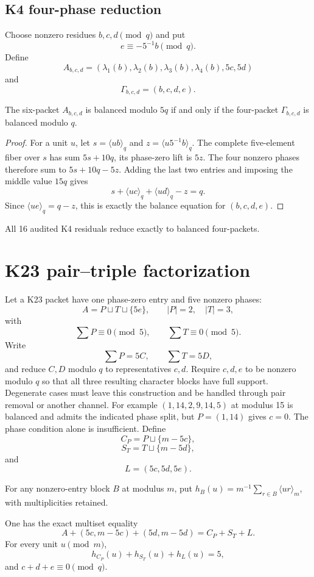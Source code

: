 \section{K4 four-phase reduction}
Choose nonzero residues \(b,c,d\pmod q\) and put
\[
e\equiv-5^{-1}b\pmod q.
\]
Define
\[
A_{b,c,d}=
(\lambda_1(b),\lambda_2(b),\lambda_3(b),\lambda_4(b),5c,5d)
\]
and
\[
\Gamma_{b,c,d}=(b,c,d,e).
\]

\begin{theorem}
The six-packet \(A_{b,c,d}\) is balanced modulo \(5q\) if and only if the four-packet \(\Gamma_{b,c,d}\) is balanced modulo \(q\).
\end{theorem}
\begin{proof}
For a unit \(u\), let \(s=\langle ub\rangle_q\) and \(z=\langle u5^{-1}b\rangle_q\). The complete five-element fiber over \(s\) has sum \(5s+10q\), its phase-zero lift is \(5z\). The four nonzero phases therefore sum to \(5s+10q-5z\). Adding the last two entries and imposing the middle value \(15q\) gives
\[
s+\langle uc\rangle_q+\langle ud\rangle_q-z=q.
\]
Since \(\langle ue\rangle_q=q-z\), this is exactly the balance equation for \((b,c,d,e)\).
\end{proof}

All 16 audited K4 residuals reduce exactly to balanced four-packets.

\chapter{K23 pair--triple factorization}
Let a K23 packet have one phase-zero entry and five nonzero phases:
\[
A=P\sqcup T\sqcup\{5e\},
\qquad |P|=2,
\quad |T|=3,
\]
with
\[
\sum P\equiv0\pmod5,
\qquad
\sum T\equiv0\pmod5.
\]
Write
\[
\sum P=5C,
\qquad
\sum T=5D,
\]
and reduce \(C,D\) modulo \(q\) to representatives \(c,d\). Require $c,d,e$ to be nonzero modulo $q$ so that all three resulting character blocks have full support. Degenerate cases must leave this construction and be handled through pair removal or another channel. For example $(1,14,2,9,14,5)$ at modulus 15 is balanced and admits the indicated phase split, but $P=(1,14)$ gives $c=0$. The phase condition alone is insufficient. Define
\[
C_P=P\sqcup\{m-5c\},
\]
\[
S_T=T\sqcup\{m-5d\},
\]
and
\[
L=(5c,5d,5e).
\]

For any nonzero-entry block $B$ at modulus $m$, put $h_B(u)=m^{-1}\sum_{r\in B}\langle ur\rangle_m$, with multiplicities retained.

\begin{theorem}
One has the exact multiset equality
\begin{equation}\label{eq:legacy-15.1}
\boxed{
A+(5c,m-5c)+(5d,m-5d)=C_P+S_T+L.
}\end{equation}
For every unit \(u\pmod m\),
\[
h_{C_P}(u)+h_{S_T}(u)+h_L(u)=5,
\]
and \(c+d+e\equiv0\pmod q\).
\end{theorem}

